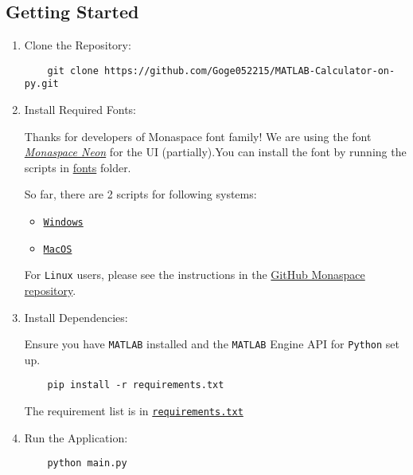 \documentclass{article}
\begin{document}
\hfill

\subsection{Getting Started}

\noindent

\begin{enumerate}
\def\labelenumi{\arabic{enumi}.}
\item Clone the Repository:

\begin{verbatim}
    git clone https://github.com/Goge052215/MATLAB-Calculator-on-py.git
\end{verbatim}

\item Install Required Fonts:

  Thanks for developers of Monaspace font family! We are using the font
  \href{https://monaspace.githubnext.com/}{\textit{Monaspace Neon}} for
  the UI (partially).You can install the font by running the scripts in
  \url{fonts} folder.

  So far, there are 2 scripts for following systems:

  \begin{itemize}
  \item \href{https://github.com/Goge052215/MATLAB-Calculator-on-py/blob/master/fonts/fonts_download.ps1}{\texttt{Windows}}
  \item \href{https://github.com/Goge052215/MATLAB-Calculator-on-py/blob/master/fonts/fonts_download.bash}{\texttt{MacOS}}
  \end{itemize}

  \noindent For \texttt{Linux} users, please see the instructions in the
  \href{https://github.com/githubnext/monaspace?tab=readme-ov-file}{GitHub
  Monaspace repository}.

\item Install Dependencies:

  \noindent Ensure you have \texttt{MATLAB} installed and the \texttt{MATLAB} Engine API for \texttt{Python}
  set up.

\begin{verbatim}
    pip install -r requirements.txt
\end{verbatim}

  \noindent The requirement list is in \href{https://github.com/Goge052215/MATLAB-Calculator-on-py/blob/master/requirements.txt}{\texttt{requirements.txt}}

\item Run the Application:

\begin{verbatim}
    python main.py
\end{verbatim}
\end{enumerate}
\end{document}
